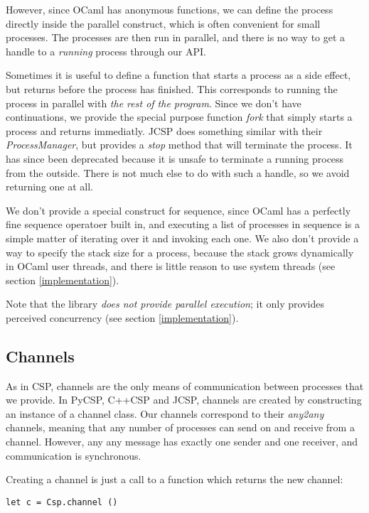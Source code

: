 \documentclass[a4paper,12pt]{article}
\begin{document}
However, since OCaml has anonymous functions, we can define the process directly inside
the parallel construct, which is often convenient for small processes. The processes
are then run in parallel, and there is no way to get a handle to a \emph{running} process
through our API.

Sometimes it is useful to define a function that starts a process as a side effect, but
returns before the process has finished. This corresponds to running the process in 
parallel with \emph{the rest of the program}. Since we don't have continuations, we 
provide the special purpose function \emph{fork} that simply starts a process and returns
immediatly. JCSP does something similar with their \emph{ProcessManager}, but provides a
\emph{stop} method that will terminate the process. It has since been deprecated because
it is unsafe to terminate a running process from the outside. There is not much else to 
do with such a handle, so we avoid returning one at all.

We don't provide a special construct for sequence, since OCaml has a perfectly fine 
sequence operatoer built in, and executing a list of processes in sequence is a simple
matter of iterating over it and invoking each one. We also don't provide a way to specify 
the stack size for a process, because the stack grows dynamically in OCaml user threads, 
and there is little reason to use system threads (see section \ref{implementation}).

Note that the library \emph{does not provide parallel execution}; it only provides 
perceived concurrency (see section \ref{implementation}).

\subsection{Channels}

As in CSP, channels are the only means of communication between processes that we provide.
In PyCSP, C++CSP and JCSP, channels are created by constructing an instance of a channel
class. Our channels correspond to their \emph{any2any} channels, meaning that any number
of processes can send on and receive from a channel. However, any any message has exactly 
one sender and one receiver, and communication is synchronous.

Creating a channel is just a call to a function which returns the new channel:
\begin{verbatim}
let c = Csp.channel ()
\end{verbatim}
\end{document}
